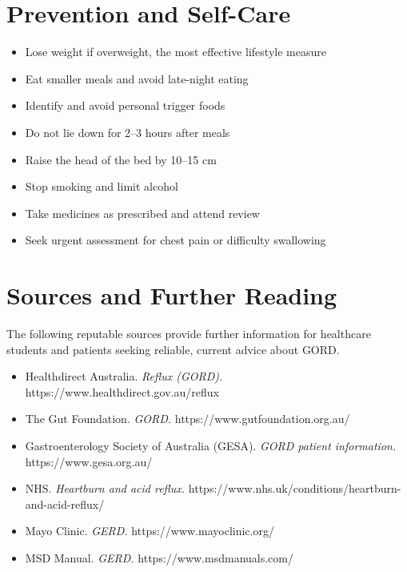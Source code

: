 \section*{Prevention and Self-Care}
\begin{itemize}
    \item Lose weight if overweight, the most effective lifestyle measure
    \item Eat smaller meals and avoid late-night eating
    \item Identify and avoid personal trigger foods
    \item Do not lie down for 2--3 hours after meals
    \item Raise the head of the bed by 10--15 cm
    \item Stop smoking and limit alcohol
    \item Take medicines as prescribed and attend review
    \item Seek urgent assessment for chest pain or difficulty swallowing
\end{itemize}

\section*{Sources and Further Reading}
The following reputable sources provide further information for healthcare students and patients seeking reliable, current advice about GORD.
\begin{itemize}
    \item Healthdirect Australia. \textit{Reflux (GORD).} https://www.healthdirect.gov.au/reflux
    \item The Gut Foundation. \textit{GORD.} https://www.gutfoundation.org.au/
    \item Gastroenterology Society of Australia (GESA). \textit{GORD patient information.} https://www.gesa.org.au/
    \item NHS. \textit{Heartburn and acid reflux.} https://www.nhs.uk/conditions/heartburn-and-acid-reflux/
    \item Mayo Clinic. \textit{GERD.} https://www.mayoclinic.org/
    \item MSD Manual. \textit{GERD.} https://www.msdmanuals.com/
\end{itemize}
